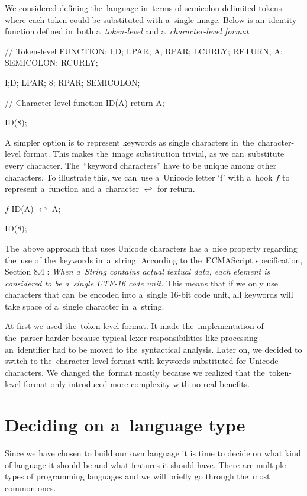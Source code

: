 We considered defining the~language in~terms of semicolon delimited tokens where each token could be substituted with a~single image.
Below is an~identity function defined in~both a~\emph{token-level} and a~\emph{character-level format}.
\begin{code}
// Token-level
FUNCTION; I;D; LPAR; A; RPAR; LCURLY;
RETURN; A; SEMICOLON;
RCURLY;

I;D; LPAR; 8; RPAR; SEMICOLON;

// Character-level
function ID(A) {
    return A;
}

ID(8);
\end{code}

A simpler option is to represent keywords as single characters in~the~character-level format. This makes the~image substitution trivial, as we can~substitute
every character. The~``keyword characters'' have to be unique among other characters. To illustrate this, we can~use a~Unicode letter `f' with a~hook $f$
to represent a~function and a~character $\hookleftarrow$ for return.
\begin{code}
$f$ ID(A) {
    $\hookleftarrow$ A;
}

ID(8);
\end{code}

The~above approach that uses Unicode characters has a~nice property regarding the~use of the~keywords in~a~string. According to the~ECMAScript specification,
Section 8.4 \cite{Ecmascript}: \emph{When a~String contains actual textual data, each element is considered to be a~single UTF-16 code unit.} This means that if we
only use characters that can~be encoded into a~single 16-bit code unit, all keywords will take space of a~single character in~a~string.

At first we used the~token-level format. It made the~implementation of the~parser harder because typical lexer responsibilities like processing
an~identifier had to be moved to the~syntactical analysis. Later on, we decided to switch to the~character-level format with keywords substituted for
Unicode characters. We changed the~format mostly because we realized that the~token-level format only introduced more complexity with no real benefits.

\section{Deciding on a~language type}
Since we have chosen to build our own language it is time to decide on what kind of language it should be and what features it should have. There are
multiple types of programming languages and we will briefly go through the~most common ones.

